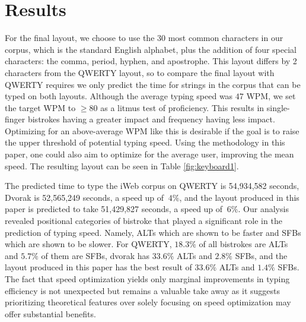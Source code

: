 \section{Results}

For the final layout, we choose to use the 30 most common characters in our corpus, which is the standard English alphabet, plus the addition of four special characters: the comma, period, hyphen, and apostrophe. This layout differs by 2 characters from the QWERTY layout, so to compare the final layout with QWERTY requires we only predict the time for strings in the corpus that can be typed on both layouts. Although the average typing speed was $47$ WPM, we set the target WPM to $\geq80$ as a litmus test of proficiency. This results in single-finger bistrokes having a greater impact and frequency having less impact. Optimizing for an above-average WPM like this is desirable if the goal is to raise the upper threshold of potential typing speed. Using the methodology in this paper, one could also aim to optimize for the average user, improving the mean speed. The resulting layout can be seen in Table \ref{fig:keyboard1}.


\noindent The predicted time to type the iWeb corpus on QWERTY is 54,934,582 seconds, Dvorak is 52,565,249 seconds, a speed up of $~4\%$, and the layout produced in this paper is predicted to take 51,429,827 seconds, a speed up of $~6\%$. Our analysis revealed positional categories of bistroke that played a significant role in the prediction of typing speed. Namely, ALTs which are shown to be faster and SFBs which are shown to be slower. For QWERTY, $18.3\%$ of all bistrokes are ALTs and $5.7\%$ of them are SFBs, dvorak has $33.6\%$ ALTs and $2.8\%$ SFBs, and the layout produced in this paper has the best result of $33.6\%$ ALTs and $1.4\%$ SFBs. The fact that speed optimization yields only marginal improvements in typing efficiency is not unexpected but remains a valuable take away as it suggests prioritizing theoretical features over solely focusing on speed optimization may offer substantial benefits.


